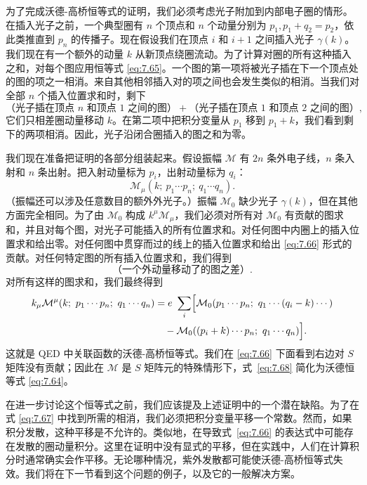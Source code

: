 为了完成沃德-高桥恒等式的证明，我们必须考虑光子附加到内部电子圈的情形。在插入光子之前，一个典型圈有 $n$ 个顶点和 $n$ 个动量分别为 $p_1, p_1+q_2 = p_2$，依此类推直到 $p_n$ 的传播子。现在假设我们在顶点 $i$ 和 $i+1$ 之间插入光子 $\gamma(k)$。我们现在有一个额外的动量 $k$ 从新顶点绕圈流动。为了计算对圈的所有这种插入之和，对每个图应用恒等式 \eqref{eq:7.65}。一个图的第一项将被光子插在下一个顶点处的图的项之一相消。来自其他相邻插入对的项之间也会发生类似的相消。当我们对全部 $n$ 个插入位置求和时，剩下
\begin{equation}
  \text{（光子插在顶点 }n\text{ 和顶点 }1\text{ 之间的图）}
  + \text{（光子插在顶点 }1\text{ 和顶点 }2\text{ 之间的图）},
  \label{eq:7.67}
\end{equation}
它们只相差圈动量移动 $k$。在第二项中把积分变量从 $p_1$ 移到 $p_1+k$，我们看到剩下的两项相消。因此，光子沿闭合圈插入的图之和为零。

我们现在准备把证明的各部分组装起来。假设振幅 $\mathcal{M}$ 有 $2n$ 条外电子线，$n$ 条入射和 $n$ 条出射。把入射动量标为 $p_i$，出射动量标为 $q_i$：
\begin{equation}
  \mathcal{M}_\mu(k;\ p_1\cdots p_n;\ q_1\cdots q_n) .
\end{equation}
（振幅还可以涉及任意数目的额外外光子。）振幅 $\mathcal{M}_0$ 缺少光子 $\gamma(k)$，但在其他方面完全相同。为了由 $\mathcal{M}_0$ 构成 $k^\mu\mathcal{M}_\mu$，我们必须对所有对 $\mathcal{M}_0$ 有贡献的图求和，并且对每个图，对光子可能插入的所有位置求和。对任何图中内圈上的插入位置求和给出零。对任何图中贯穿而过的线上的插入位置求和给出 \eqref{eq:7.66} 形式的贡献。对任何特定图的所有插入位置求和，我们得到
\begin{equation}
  \text{（一个外动量移动了的图之差）} .
\end{equation}
对所有这样的图求和，我们最终得到
\begin{equation}
  \begin{aligned}
    k_\mu\mathcal{M}^{\mu}(k;\ p_1\cdots p_n;\ q_1\cdots q_n)
    &= e\ \sum_{i} \Bigl[ \mathcal{M}_0(p_1\cdots p_n;\ q_1\cdots
      (q_i-k)\cdots)\\
    &\quad - \mathcal{M}_0((p_i+k)\cdots p_n;\ q_1\cdots q_n) \Bigr].
  \end{aligned}
  \label{eq:7.68}
\end{equation}
这就是 QED 中关联函数的沃德-高桥恒等式。我们在 \eqref{eq:7.66} 下面看到右边对 $S$ 矩阵没有贡献；因此在 $\mathcal{M}$ 是 $S$ 矩阵元的特殊情形下，式~\eqref{eq:7.68} 简化为沃德恒等式 \eqref{eq:7.64}。

在进一步讨论这个恒等式之前，我们应该提及上述证明中的一个潜在缺陷。为了在式 \eqref{eq:7.67} 中找到所需的相消，我们必须把积分变量平移一个常数。然而，如果积分发散，这种平移是不允许的。类似地，在导致式~\eqref{eq:7.66} 的表达式中可能存在发散的圈动量积分。这里在证明中没有显式的平移，但在实践中，人们在计算积分时通常确实会作平移。无论哪种情况，紫外发散都可能使沃德-高桥恒等式失效。我们将在下一节看到这个问题的例子，以及它的一般解决方案。

